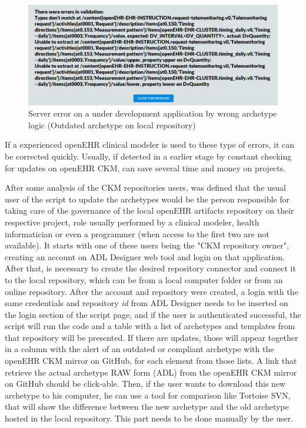 \documentclass[mim_thesis.tex]{subfiles}
\begin{document}
\begin{figure}[H]
	\centering
    \includegraphics[width=1\textwidth]{img/server_error.PNG}
	\caption{Server error on a under development application by wrong archetype logic (Outdated archetype on local repository)}
	\label{fig:server_arch_error}
\end{figure}

If a experienced openEHR clinical modeler is used to these type of errors, it can be corrected quickly. Usually, if detected in a earlier stage by constant checking for updates on openEHR CKM, can save several time and money on projects.

After some analysis of the CKM repositories users, was defined that the usual user of the script to update the archetypes would be the person responsible for taking care of the governance of the local openEHR artifacts repository on their respective project, role usually performed by a clinical modeler, health informatician or even a programmer (when access to the first two are not available). It starts with one of these users being the "CKM repository owner", creating an account on ADL Designer web tool and login on that application. After that, is necessary to create the desired repository connector and connect it to the local repository, which can be from a local computer folder or from an online repository. After the account and repository were created, a login with the same credentials and repository \textit{id} from ADL Designer needs to be inserted on the login section of the script page, and if the user is authenticated successful, the script will run the code and a table with a list of archetypes and templates from that repository will be presented. If there are updates, those will appear together in a column with the alert of an outdated or compliant archetype with the openEHR CKM mirror on GitHub, for each element from those lists. A link that retrieve the actual archetype RAW form (ADL) from the openEHR CKM mirror on GitHub should be click-able. Then, if the user wants to download this new archetype to his computer, he can use a tool for comparison like Tortoise SVN, that will show the difference between the new archetype and the old archetype hosted in the local repository. This part needs to be done manually by the user. 
\end{document}
